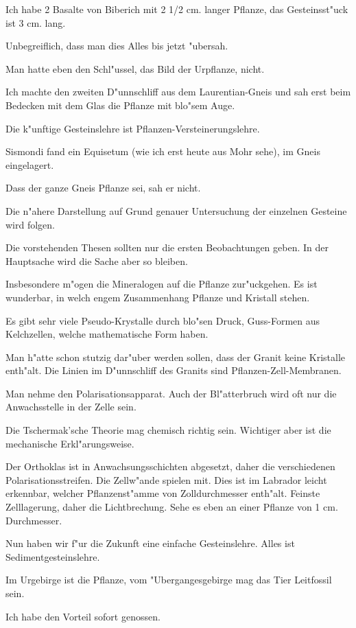 \documentclass[a4paper, 11pt, oneside, german]{article}
\begin{document}
Ich habe 2 Basalte von Biberich mit 2 1/2 cm. langer Pflanze, das Gesteinsst"uck ist 3 cm. lang.

Unbegreiflich, dass man dies Alles bis jetzt "ubersah.

Man hatte eben den Schl"ussel, das Bild der Urpflanze, nicht.

Ich machte den zweiten D"unnschliff aus dem Laurentian-Gneis und sah erst beim Bedecken mit dem Glas die Pflanze mit blo"sem Auge.

Die k"unftige Gesteinslehre ist Pflanzen-Versteinerungslehre.

Sismondi fand ein Equisetum (wie ich erst heute aus Mohr sehe), im Gneis eingelagert.

Dass der ganze Gneis Pflanze sei, sah er nicht.

Die n"ahere Darstellung auf Grund genauer Untersuchung der einzelnen Gesteine wird folgen.

Die vorstehenden Thesen sollten nur die ersten Beobachtungen geben. In der Hauptsache wird die Sache aber so bleiben.

Insbesondere m"ogen die Mineralogen auf die Pflanze zur"uckgehen. Es ist wunderbar, in welch engem Zusammenhang Pflanze und Kristall stehen.

Es gibt sehr viele Pseudo-Krystalle durch blo"sen Druck, Guss-Formen aus Kelchzellen, welche mathematische Form haben.

Man h"atte schon stutzig dar"uber werden sollen, dass der Granit keine Kristalle enth"alt. Die Linien im D"unnschliff des Granits sind Pflanzen-Zell-Membranen.

Man nehme den Polarisationsapparat. Auch der Bl"atterbruch wird oft nur die Anwachsstelle in der Zelle sein.

Die Tschermak'sche Theorie mag chemisch richtig sein. Wichtiger aber ist die mechanische Erkl"arungsweise.

Der Orthoklas ist in Anwachsungsschichten abgesetzt, daher die verschiedenen Polarisationsstreifen. Die Zellw"ande spielen mit. Dies ist im Labrador leicht erkennbar, welcher Pflanzenst"amme von Zolldurchmesser enth"alt. Feinste Zelllagerung, daher die Lichtbrechung. Sehe es eben an einer Pflanze von 1 cm. Durchmesser.

Nun haben wir f"ur die Zukunft eine einfache Gesteinslehre. Alles ist Sedimentgesteinslehre.

Im Urgebirge ist die Pflanze, vom "Ubergangesgebirge mag das Tier Leitfossil sein.

Ich habe den Vorteil sofort genossen.
\end{document}
